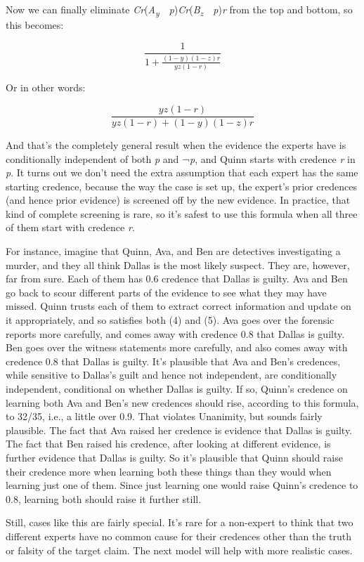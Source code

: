 \documentclass[
  11pt,
  letterpaper,
  DIV=11,
  numbers=noendperiod,
  twoside]{scrartcl}
\begin{document}
Now we can finally eliminate
\emph{Cr}(\emph{A\textsubscript{y}}~\textbar~\emph{p})\emph{Cr}(\emph{B\textsubscript{z}}~\textbar~\emph{p})\emph{r}
from the top and bottom, so this becomes:

\[
\frac{1}{1 + \frac{(1-y)(1-z)r}{yz(1-r)}}
\]

Or in other words:

\[
\frac{yz(1-r)}{yz(1-r) + (1-y)(1-z)r}
\]

And that's the completely general result when the evidence the experts
have is conditionally independent of both \emph{p} and ¬\emph{p}, and
Quinn starts with credence \emph{r} in \emph{p}. It turns out we don't
need the extra assumption that each expert has the same starting
credence, because the way the case is set up, the expert's prior
credences (and hence prior evidence) is screened off by the new
evidence. In practice, that kind of complete screening is rare, so it's
safest to use this formula when all three of them start with credence
\emph{r}.

For instance, imagine that Quinn, Ava, and Ben are detectives
investigating a murder, and they all think Dallas is the most likely
suspect. They are, however, far from sure. Each of them has 0.6 credence
that Dallas is guilty. Ava and Ben go back to scour different parts of
the evidence to see what they may have missed. Quinn trusts each of them
to extract correct information and update on it appropriately, and so
satisfies both (4) and (5). Ava goes over the forensic reports more
carefully, and comes away with credence 0.8 that Dallas is guilty. Ben
goes over the witness statements more carefully, and also comes away
with credence 0.8 that Dallas is guilty. It's plausible that Ava and
Ben's credences, while sensitive to Dallas's guilt and hence not
independent, are conditionally independent, conditional on whether
Dallas is guilty. If so, Quinn's credence on learning both Ava and Ben's
new credences should rise, according to this formula, to 32/35, i.e., a
little over 0.9. That violates Unanimity, but sounds fairly plausible.
The fact that Ava raised her credence is evidence that Dallas is guilty.
The fact that Ben raised his credence, after looking at different
evidence, is further evidence that Dallas is guilty. So it's plausible
that Quinn should raise their credence more when learning both these
things than they would when learning just one of them. Since just
learning one would raise Quinn's credence to 0.8, learning both should
raise it further still.

Still, cases like this are fairly special. It's rare for a non-expert to
think that two different experts have no common cause for their
credences other than the truth or falsity of the target claim. The next
model will help with more realistic cases.
\end{document}
